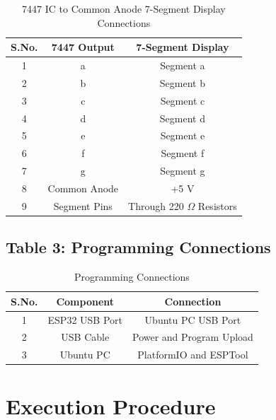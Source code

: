 \documentclass[12pt,a4paper]{article}
\begin{document}
\begin{table}[h]
\centering
\begin{tabular}{|c|c|c|}
\hline
\textbf{S.No.} & \textbf{7447 Output} & \textbf{7-Segment Display} \\ \hline
1 & a & Segment a \\ \hline
2 & b & Segment b \\ \hline
3 & c & Segment c \\ \hline
4 & d & Segment d \\ \hline
5 & e & Segment e \\ \hline
6 & f & Segment f \\ \hline
7 & g & Segment g \\ \hline
8 & Common Anode & +5 V \\ \hline
9 & Segment Pins & Through 220 $\Omega$ Resistors \\ \hline
\end{tabular}
\caption{7447 IC to Common Anode 7-Segment Display Connections}
\label{tab:7447display}
\end{table}


\subsection*{Table 3: Programming Connections}

\begin{table}[h]
\centering
\begin{tabular}{|c|c|c|}
\hline
\textbf{S.No.} & \textbf{Component} & \textbf{Connection} \\ \hline
1 & ESP32 USB Port & Ubuntu PC USB Port \\ \hline
2 & USB Cable & Power and Program Upload \\ \hline
3 & Ubuntu PC & PlatformIO and ESPTool \\ \hline
\end{tabular}
\caption{Programming Connections}
\label{tab:programming}
\end{table}
\section*{Execution Procedure}
\end{document}
